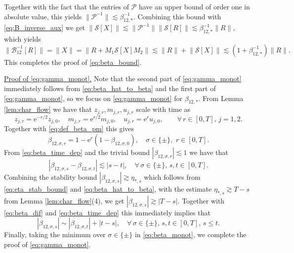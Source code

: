 \documentclass[10pt]{amsart}
\numberwithin{equation}{section}
\newcommand{\ee}{\mathrm{e}}
\begin{document}
Together with the fact that the entries of $\mathcal{P}$ have an upper bound of order one in absolute value, this yields $\|\mathcal{P}^{-1}\|\lesssim \beta_{12,*}^{-1}$. Combining this bound with \eqref{eq:B_inverse_aux} we get $\|\mathcal{S}[X]\|\lesssim \lVert \mathcal{P}^{-1}\rVert\lVert \mathcal{S}[R]\rVert\lesssim \beta_{12,*}^{-1}\|R\|$, which yields
\begin{equation}
\lVert\mathcal{B}_{12}^{-1}[R]\rVert=\lVert X\rVert = \lVert R+M_1\mathcal{S}[X]M_2\rVert \lesssim \lVert R\rVert + \lVert \mathcal{S}[X]\rVert\lesssim (1 +\beta_{12,*}^{-1})\|R\|.
\end{equation}
This completes the proof of \eqref{eq:beta_bound}.

\medskip

\noindent\underline{Proof of \eqref{eq:gamma_monot}.} Note that the second part of \eqref{eq:gamma_monot} immediately follows from \eqref{eq:beta_hat_to_beta} and the first part of \eqref{eq:gamma_monot}, so we focus on \eqref{eq:gamma_monot} for $\beta_{12,*}$. From Lemma \ref{lem:char_flow} we have that $z_{j,r}, m_{j,r}, u_{j,r}$ scale with time as
\begin{equation}
z_{j,r}=\ee^{-r/2}z_{j,0},\quad m_{j,r}=\ee^{r/2} m_{j,0},\quad u_{j,r}=\ee^r u_{j,0},\qquad \forall \,r\in [0,T], \, j=1,2.
\label{eq:time_scaling}
\end{equation}
Together with \eqref{eq:def_beta_pm} this gives
\begin{equation}
\beta_{12,\sigma,r} = 1-\ee^{r}(1-\beta_{12,\sigma,0}),\quad \sigma\in\{\pm\},\,\, r\in [0,T].
\label{eq:beta_time_dep}
\end{equation}
From \eqref{eq:beta_time_dep} and the trivial bound $|\beta_{12,\sigma,r}|\lesssim 1$ we have that
\begin{equation}
|\beta_{12,\sigma,s}-\beta_{12,\sigma,t}|\lesssim |s-t|,\quad \forall\, \sigma\in\{\pm\},\, s,t\in [0,T].
\label{eq:beta_dif}
\end{equation}
Combining the stability bound $|\beta_{12,\sigma,s}|\gtrsim \eta_{*,s}$ which follows from \eqref{eq:eta_stab_bound} and \eqref{eq:beta_hat_to_beta}, with the estimate $\eta_{*,s}\gtrsim T-s$ from Lemma \ref{lem:char_flow}(4), we get $|\beta_{12,\sigma,s}|\gtrsim |T-s|$. Together with \eqref{eq:beta_dif} and \eqref{eq:beta_time_dep} this immediately implies that 
\begin{equation}
|\beta_{12,\sigma,s}|\sim |\beta_{12,\sigma,t}| + |t-s|,\quad \forall\, \sigma\in\{\pm\},\, s,t\in [0,T],\, s\le t.
\label{eq:beta_monot}
\end{equation}
Finally, taking the minimum over $\sigma\in\{\pm\}$ in \eqref{eq:beta_monot}, we complete the proof of \eqref{eq:gamma_monot}.
\end{document}
